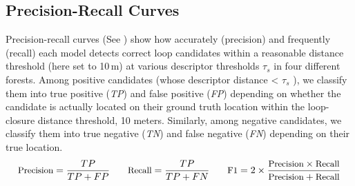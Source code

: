 \subsection*{Precision-Recall Curves}
Precision-recall curves (See ) show how accurately (precision) and frequently (recall) each  model detects correct loop candidates within a reasonable distance threshold (here set to 10\,m) at various descriptor thresholds $\tau_{s}$ in four different forests. Among positive candidates   (whose descriptor distance < $\tau_{s}$ ), we classify them into true positive (\emph{TP}) and false positive (\emph{FP}) depending on whether the candidate is actually located on their ground truth location within the loop-closure distance threshold, 10 meters. 
Similarly, among negative candidates, we classify them into true negative (\emph{TN}) and false negative (\emph{FN}) depending on their true location. 
\begin{equation}
  \small
  \text{Precision} = \frac{TP}{TP + FP} \quad \quad \text{Recall} = \frac{TP}{TP + FN} \quad \quad \text{F1} = 2 \times \frac{\text{Precision} \times \text{Recall}}{\text{Precision} + \text{Recall}}
\end{equation}

